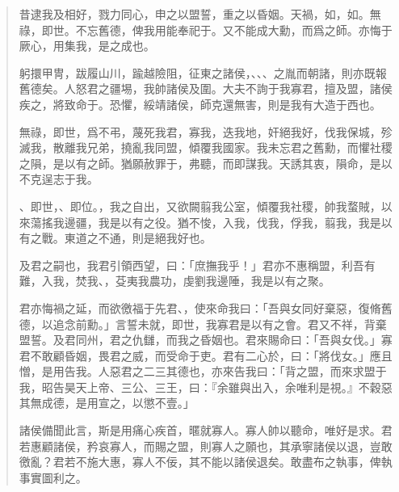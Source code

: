 \begin{quotation}昔逮我及相好，戮力同心，申之以盟誓，重之以昏姻。天禍，如，如。無祿，即世。不忘舊德，俾我用能奉祀于。又不能成大勳，而爲之師。亦悔于厥心，用集我，是之成也。

躬擐甲冑，跋履山川，踰越險阻，征東之諸侯，、、、之胤而朝諸，則亦既報舊德矣。人怒君之疆埸，我帥諸侯及圍。大夫不詢于我寡君，擅及盟，諸侯疾之，將致命于。恐懼，綏靖諸侯，師克還無害，則是我有大造于西也。

無祿，即世，爲不弔，蔑死我君，寡我，迭我地，奸絕我好，伐我保城，殄滅我，散離我兄弟，撓亂我同盟，傾覆我國家。我未忘君之舊勳，而懼社稷之隕，是以有之師。猶願赦罪于，弗聽，而即謀我。天誘其衷，隕命，是以不克逞志于我。

、即世，、即位。，我之自出，又欲闕翦我公室，傾覆我社稷，帥我蝥賊，以來蕩搖我邊疆，我是以有之役。猶不悛，入我，伐我，俘我，翦我，我是以有之戰。東道之不通，則是絕我好也。

及君之嗣也，我君引領西望，曰：「庶撫我乎！」君亦不惠稱盟，利吾有難，入我，焚我、，芟夷我農功，虔劉我邊陲，我是以有之聚。

君亦悔禍之延，而欲徼福于先君、，使來命我曰：「吾與女同好棄惡，復脩舊德，以追念前勳。」言誓未就，即世，我寡君是以有之會。君又不祥，背棄盟誓。及君同州，君之仇讎，而我之昏姻也。君來賜命曰：「吾與女伐。」寡君不敢顧昏姻，畏君之威，而受命于吏。君有二心於，曰：「將伐女。」應且憎，是用告我。人惡君之二三其德也，亦來告我曰：「背之盟，而來求盟于我，昭告昊天上帝、三公、三王，曰：『余雖與出入，余唯利是視。』不穀惡其無成德，是用宣之，以懲不壹。」

諸侯備聞此言，斯是用痛心疾首，暱就寡人。寡人帥以聽命，唯好是求。君若惠顧諸侯，矜哀寡人，而賜之盟，則寡人之願也，其承寧諸侯以退，豈敢徼亂？君若不施大惠，寡人不佞，其不能以諸侯退矣。敢盡布之執事，俾執事實圖利之。
\end{quotation}

